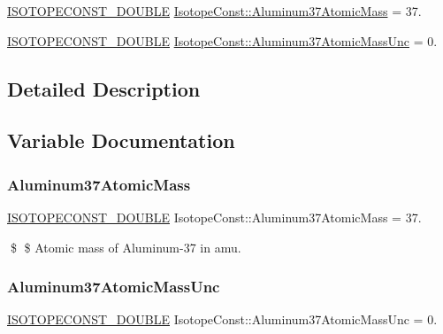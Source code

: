 \begin{DoxyCompactItemize}
\item 
\mbox{\hyperlink{group___isotope_const-_macros_ga8f45a7272ce02c0b4c65c44636ed719a}{I\+S\+O\+T\+O\+P\+E\+C\+O\+N\+S\+T\+\_\+\+D\+O\+U\+B\+LE}} \mbox{\hyperlink{group___isotope_const-_aluminum-_al37_ga71371894ce6ef30777a5c5ed06cb71d6}{Isotope\+Const\+::\+Aluminum37\+Atomic\+Mass}} = 37.
\item 
\mbox{\hyperlink{group___isotope_const-_macros_ga8f45a7272ce02c0b4c65c44636ed719a}{I\+S\+O\+T\+O\+P\+E\+C\+O\+N\+S\+T\+\_\+\+D\+O\+U\+B\+LE}} \mbox{\hyperlink{group___isotope_const-_aluminum-_al37_ga63ac23e1f42862d5c217db94bb231960}{Isotope\+Const\+::\+Aluminum37\+Atomic\+Mass\+Unc}} = 0.
\end{DoxyCompactItemize}


\subsection{Detailed Description}


\subsection{Variable Documentation}
\mbox{\label{group___isotope_const-_aluminum-_al37_ga71371894ce6ef30777a5c5ed06cb71d6}} 
\subsubsection{\texorpdfstring{Aluminum37\+Atomic\+Mass}{Aluminum37AtomicMass}}
{\footnotesize\ttfamily \mbox{\hyperlink{group___isotope_const-_macros_ga8f45a7272ce02c0b4c65c44636ed719a}{I\+S\+O\+T\+O\+P\+E\+C\+O\+N\+S\+T\+\_\+\+D\+O\+U\+B\+LE}} Isotope\+Const\+::\+Aluminum37\+Atomic\+Mass = 37.}

\$ \$ Atomic mass of Aluminum-\/37 in amu. \mbox{\label{group___isotope_const-_aluminum-_al37_ga63ac23e1f42862d5c217db94bb231960}} 
\subsubsection{\texorpdfstring{Aluminum37\+Atomic\+Mass\+Unc}{Aluminum37AtomicMassUnc}}
{\footnotesize\ttfamily \mbox{\hyperlink{group___isotope_const-_macros_ga8f45a7272ce02c0b4c65c44636ed719a}{I\+S\+O\+T\+O\+P\+E\+C\+O\+N\+S\+T\+\_\+\+D\+O\+U\+B\+LE}} Isotope\+Const\+::\+Aluminum37\+Atomic\+Mass\+Unc = 0.}

